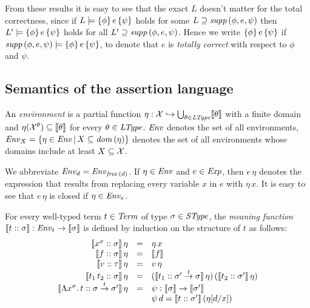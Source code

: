 \documentclass[12pt,a4paper]{report}
\begin{document}
From these results it is easy to see that the exact $L$ doesn't matter for the total correctness, since
if $L\models\{\phi\}\,e\,\{\psi\}$ holds for some $L \supseteq \mathit{supp}\,(\phi,e,\psi)$
then $L'\models\{\phi\}\,e\,\{\psi\}$ holds for all $L'\supseteq \mathit{supp}\,(\phi,e,\psi)$.
Hence we write $\{\phi\}\,e\,\{\psi\}$ if $\mathit{supp}\,(\phi,e,\psi)\models\{\phi\}\,e\,\{\psi\}$,
to denote that $e$ is {\em totally correct} with respect to $\phi$ and $\psi$. 



\subsection{Semantics of the assertion language}

\begin{definition}[Environment] \label{definition:Environment}
  An {\em environment} is a partial function $\eta: \mathcal{X} \hookrightarrow \bigcup_{\theta\in\mathit{LType}} \llbracket\theta\rrbracket$ with
  a finite domain and $\eta(\mathcal{X}^\theta) \subseteq \llbracket\theta\rrbracket$ for every $\theta \in \mathit{LType}$. $\mathit{Env}$ denotes
  the set of all environments, $\mathit{Env}_X = \{\eta\in\mathit{Env}\,|\,X \subseteq \mathit{dom}\,(\eta)\}$ denotes the set of
  all environments whose domains include at least $X \subseteq \mathcal{X}$.
\end{definition}

We abbreviate $\mathit{Env}_d = \mathit{Env}_{\mathit{free}\,(d)}$. If $\eta \in \mathit{Env}$ and $e \in \mathit{Exp}$, then $e\,\eta$ denotes
the expression that results from replacing every variable $x$ in $e$ with $\eta\,x$. It is
easy to see that $e\,\eta$ is closed if $\eta \in \mathit{Env}_e$.

For every well-typed term $t \in \mathit{Term}$ of type $\sigma \in \mathit{SType}$, the {\em meaning function}
$\llbracket t\mathrel{::}\sigma\rrbracket: \mathit{Env}_t \to \llbracket\sigma\rrbracket$ is defined by induction on the structure of $t$ as
follows:
\[\begin{array}{rcl}
  \llbracket x^\sigma\mathrel{::}\sigma\rrbracket\,\eta
    &=& \eta\,x \\
  \llbracket f\mathrel{::}\sigma\rrbracket\,\eta 
    &=& \llbracket f\rrbracket \\
  \llbracket v\mathrel{::}\tau\rrbracket\,\eta
    &=& v\,\eta \\
  \llbracket t_1\,t_2\mathrel{::}\sigma\rrbracket\,\eta
    &=& (\llbracket t_1\mathrel{::}\sigma'\stackrel{t}{\to}\sigma\rrbracket\,\eta)\,
        (\llbracket t_2\mathrel{::}\sigma'\rrbracket\,\eta) \\
  \llbracket\Lambda x^\sigma.\,t\mathrel{::}\sigma\stackrel{t}{\to}\sigma'\rrbracket\,\eta
    &=& \psi: \llbracket\sigma\rrbracket \to \llbracket\sigma'\rrbracket \\
    & & \psi\, d = \llbracket t\mathrel{::}\sigma'\rrbracket\,(\eta[d/x])
\end{array}\]
\end{document}
